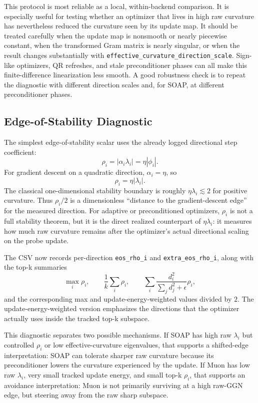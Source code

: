 \documentclass[11pt]{article}
\begin{document}
This protocol is most reliable as a local, within-backend comparison. It is
especially useful for testing whether an optimizer that lives in high raw
curvature has nevertheless reduced the curvature seen by its update map. It
should be treated carefully when the update map is nonsmooth or nearly
piecewise constant, when the transformed Gram matrix is nearly singular, or
when the result changes substantially with
\texttt{effective\_curvature\_direction\_scale}. Sign-like optimizers, QR
refreshes, and stale preconditioner phases can all make this finite-difference
linearization less smooth. A good robustness check is to repeat the diagnostic
with different direction scales and, for SOAP, at different preconditioner
phases.

\subsection{Edge-of-Stability Diagnostic}

The simplest edge-of-stability scalar uses the already logged directional
step coefficient:
\[
    \rho_i = |\alpha_i \lambda_i|
           = \eta |\phi_i|.
\]
For gradient descent on a quadratic direction, $\alpha_i=\eta$, so
\[
    \rho_i = \eta |\lambda_i|.
\]
The classical one-dimensional stability boundary is roughly
$\eta\lambda_i \lesssim 2$ for positive curvature. Thus $\rho_i/2$ is a
dimensionless ``distance to the gradient-descent edge'' for the measured
direction. For adaptive or preconditioned optimizers, $\rho_i$ is not a full
stability theorem, but it is the direct realized counterpart of
$\eta\lambda_i$: it measures how much raw curvature remains after the
optimizer's actual directional scaling on the probe update.

The CSV now records per-direction \texttt{eos\_rho\_i} and
\texttt{extra\_eos\_rho\_i}, along with the top-k summaries
\[
    \max_i \rho_i,\qquad
    \frac{1}{k}\sum_i \rho_i,\qquad
    \sum_i
    \frac{d_i^2}{\sum_j d_j^2+\epsilon}\rho_i,
\]
and the corresponding max and update-energy-weighted values divided by $2$.
The update-energy-weighted version emphasizes the directions that the
optimizer actually uses inside the tracked top-k subspace.

This diagnostic separates two possible mechanisms. If SOAP has high raw
$\lambda_i$ but controlled $\rho_i$ or low effective-curvature eigenvalues,
that supports a shifted-edge interpretation: SOAP can tolerate sharper raw
curvature because its preconditioner lowers the curvature experienced by the
update. If Muon has low raw $\lambda_i$, very small tracked update energy, and
small top-k $\rho_i$, that supports an avoidance interpretation: Muon is not
primarily surviving at a high raw-GGN edge, but steering away from the raw
sharp subspace.
\end{document}
